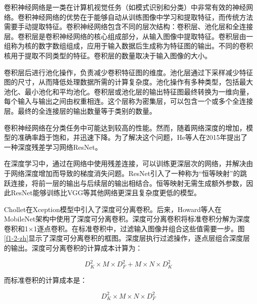 卷积神经网络是一类在计算机视觉任务（如模式识别和分类）中非常有效的神经网络。卷积神经网络的优势在于能够自动从训练图像中学习和提取特征，而传统方法需要手动提取特征。卷积神经网络包含不同的层次结构：卷积层、池化层和全连接层。卷积层是卷积神经网络的核心组成部分，从输入图像中提取特征。卷积层由一组称为核的数字数组组成，应用于输入数据后生成称为特征图的输出。不同的卷积核用于提取不同类型的特征。卷积层的数量取决于输入图像的大小。

卷积层后进行池化操作，负责减少卷积特征图的维度。池化层通过下采样减少特征图的尺寸，从而降低处理数据所需的计算复杂度。池化操作有多种类型，包括最大池化、最小池化和平均池化。卷积层或池化层的输出特征图最终转换为一维向量，每个输入与输出之间由权重相连。这个层称为密集层，可以包含一个或多个全连接层。最终的全连接层的输出数量等于类别的数量。

卷积神经网络在分类任务中可能达到较高的性能。然而，随着网络深度的增加，模型的准确率趋于饱和，并迅速下降。为了解决这个问题，He等人在2015年提出了一种深度残差学习网络ResNet。

在深度学习中，通过在网络中使用残差连接，可以训练更深层次的网络，并解决由于网络深度增加而导致的梯度消失问题。ResNet引入了一种称为“恒等映射”的跳跃连接，将前一层的输出与后续层的输出相结合。恒等映射无需生成额外参数，因此ResNet能够训练比VGG等其他网络更深且复杂度更低的模型。


Chollet在Xception模型中引入了深度可分离卷积。后来，Howard等人在MobileNet架构中使用了深度可分离卷积。深度可分离卷积将标准卷积分解为深度卷积和1×1逐点卷积。在标准卷积中，过滤输入图像并组合这些值需要一步。图\ref{f1-2-zh}显示了深度可分离卷积的框图。深度层执行过滤操作，逐点层组合深度层的输出。深度可分离卷积的计算成本计算为：

\begin{equation*} D_{K}^{2}\times M\times D_{F}^{2}+M\times N\times D_{K}^{2}\tag{1}\end{equation*}

而标准卷积的计算成本是：

\begin{equation*} D_{K}^{2}\times M\times N \times D_{F}^{2}\tag{2}\end{equation*}

